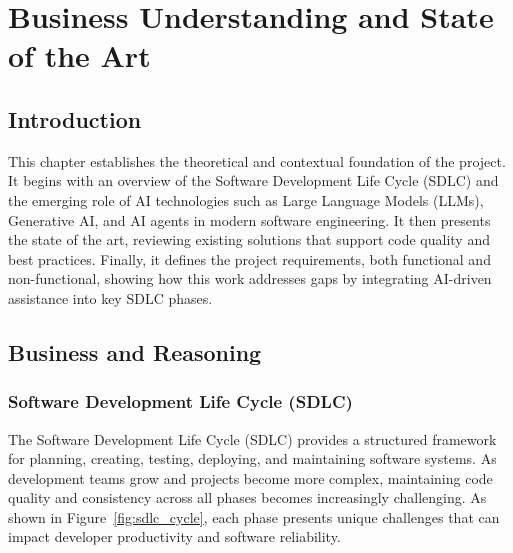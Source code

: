 
\setcounter{chapter}{1}
\chapter{Business Understanding and State of the Art}
\minitoc %
\graphicspath{{Chapitre2/figures/}}


\pagestyle{fancy}
\fancyhf{}
\fancyhead[R]{\bfseries\rightmark}
\fancyfoot[R]{\thepage}
\renewcommand{\headrulewidth}{0.5pt}
\renewcommand{\footrulewidth}{0pt}
\renewcommand{\chaptermark}[1]{\markboth{\MakeUppercase{\chaptername~\thechapter. #1 }}{}}
\renewcommand{\sectionmark}[1]{\markright{\thechapter.\thesection~ #1}}

\begin{spacing}{1.2}

\section*{Introduction}
This chapter establishes the theoretical and contextual foundation of the project. It begins with an overview of the Software Development Life Cycle (SDLC) and the emerging role of AI technologies such as Large Language Models (LLMs), Generative AI, and AI agents in modern software engineering. It then presents the state of the art, reviewing existing solutions that support code quality and best practices. Finally, it defines the project requirements, both functional and non-functional, showing how this work addresses gaps by integrating AI-driven assistance into key SDLC phases.

\section{Business and Reasoning}

\subsection{Software Development Life Cycle (SDLC)}
The Software Development Life Cycle (SDLC) provides a structured framework for planning, creating, testing, deploying, and maintaining software systems. As development teams grow and projects become more complex, maintaining code quality and consistency across all phases becomes increasingly challenging. As shown in Figure~\ref{fig:sdlc_cycle}, each phase presents unique challenges that can impact developer productivity and software reliability.


\end{spacing}
